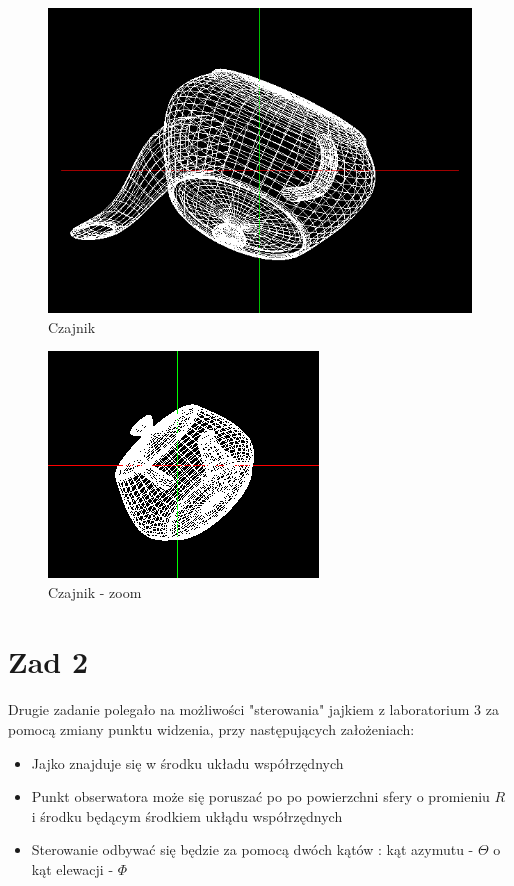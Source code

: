 \documentclass[wide,a4paper,titlepage,12pt] {article}
\begin{document}
\begin{figure}[htbp]
	 		\begin{center}
         \includegraphics[scale=0.6]{cz3.PNG}
      \caption{Czajnik}
     \end{center}
  \end{figure}
\begin{figure}[htbp]
	 		\begin{center}
         \includegraphics[scale=0.6]{cz2.PNG}
      \caption{Czajnik - zoom}
     \end{center}
  \end{figure}
\newpage
\section{Zad 2}
\paragraph{}
Drugie zadanie polegało na możliwości "sterowania" jajkiem z laboratorium 3 za pomocą zmiany punktu widzenia, przy następujących założeniach:
\begin{itemize}
	\item Jajko znajduje się w środku układu współrzędnych
	\item Punkt obserwatora może się poruszać po po powierzchni sfery o promieniu $R$ i środku będącym środkiem ukłądu współrzędnych
	\item Sterowanie odbywać się będzie za pomocą dwóch kątów : kąt azymutu - $\Theta$ o kąt elewacji - $\Phi$
\end{itemize}
\end{document}

